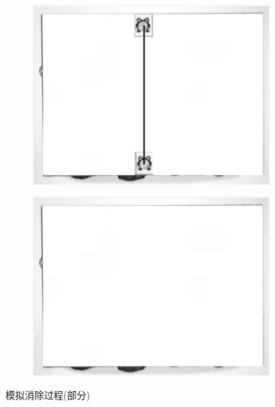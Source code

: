\documentclass{article}
\numberwithin{figure}{section}
\numberwithin{table}{section}
\numberwithin{listing}{section}
\numberwithin{equation}{section}
\begin{document}
\begin{enumerate}
\begin{figure}[H]
\begin{subfigure}{0.5\textwidth}
                    \end{subfigure}
                    \begin{subfigure}{0.5\textwidth}
                        \centering
                        \includegraphics[width=0.8\linewidth]{mocklink7}
                    \end{subfigure}%
                    \begin{subfigure}{0.5\textwidth}
                        \centering
                        \includegraphics[width=0.8\linewidth]{mocklink8}
                    \end{subfigure}
                    \caption{模拟消除过程(部分)}
                \end{figure}

        \end{enumerate}
    
\end{document}
